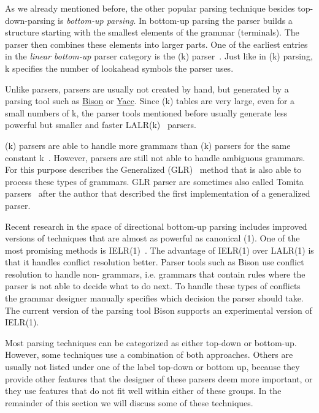 As we already mentioned before, the other popular parsing technique besides top-down-parsing is \emph{bottom-up parsing}. In bottom-up parsing the parser builds a structure starting with the smallest elements of the grammar (terminals). The parser then combines these elements into larger parts. One of the earliest entries in the \emph{linear bottom-up} parser category is the (k) parser~\cite{knuth1965translation}. Just like in (k) parsing, k specifies the number of lookahead symbols the parser uses.

\begin{sloppypar}
Unlike  parsers,  parsers are usually not created by hand, but generated by a parsing tool such as \href{https://www.gnu.org/software/bison}{Bison} or \href{http://dinosaur.compilertools.net/yacc}{Yacc}. Since (k) tables are very large, even for a small numbers of k, the parser tools mentioned before usually generate less powerful but smaller and faster LALR(k)~\cite{deremer1969practical} parsers.
\end{sloppypar}

(k) parsers are able to handle more grammars than (k) parsers for the same constant k~\cite[section “Lookahead”]{haberman2013ll}. However,  parsers are still not able to handle ambiguous grammars. For this purpose \citeauthor{lang1974deterministic} describes the Generalized  (GLR)~\cite{lang1974deterministic} method that is also able to process these types of grammars. GLR parser are sometimes also called Tomita parsers~\cite{tomita1985efficient} after the author that described the first implementation of a generalized  parser.

Recent research in the space of directional bottom-up parsing includes improved versions of techniques that are almost as powerful as canonical (1). One of the most promising methods is IELR(1)~\cite{denny2008ielr}. The advantage of IELR(1) over LALR(1) is that it handles conflict resolution better. Parser tools such as Bison use conflict resolution to handle non- grammars, i.e. grammars that contain rules where the parser is not able to decide what to do next. To handle these types of conflicts the grammar designer manually specifies which decision the parser should take. The current version of the parsing tool Bison supports an experimental version of IELR(1).

Most parsing techniques can be categorized as either top-down or bottom-up. However, some techniques use a combination of both approaches. Others are usually not listed under one of the label top-down or bottom up, because they provide other features that the designer of these parsers deem more important, or they use features that do not fit well within either of these groups. In the remainder of this section we will discuss some of these techniques.

